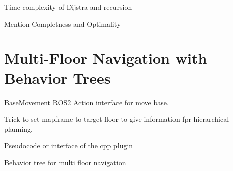 Time complexity of Dijstra and recursion

Mention Completness and Optimality





\section{Multi-Floor Navigation with Behavior Trees}
\label{sec:multi_floor_behavior_trees}

BaseMovement ROS2 Action interface for move base.

Trick to set mapframe to target floor to give information fpr hierarchical planning.

Pseudocode or interface of the cpp plugin

Behavior tree for multi floor navigation


